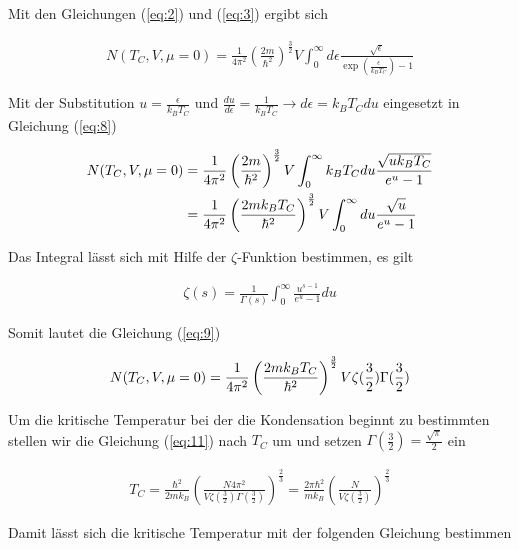 Mit den Gleichungen (\ref{eq:2}) und (\ref{eq:3}) ergibt sich

\begin{align}
  \label{eq:8}
   N(T_C,V,\mu=0) = \frac{1}{4\pi^2}\left( \frac{2m}{\hbar^2}  \right)^{\frac{3}{2}} V \int_0^\infty d\epsilon  \frac{\sqrt{\epsilon}}{\exp\left(\frac{\epsilon}{k_B T_C}\right)-1}
\end{align}

Mit der Substitution \(u=\frac{\epsilon}{k_B T_C}\) und \(\frac{du}{d\epsilon}=\frac{1}{k_B T_C} \rightarrow d\epsilon=k_B T_C du\) eingesetzt in Gleichung (\ref{eq:8})

\begin{align}
  \label{eq:9}
    N(T_C,V,\mu=0) &= \frac{1}{4\pi^2}\left( \frac{2m}{\hbar^2}  \right)^{\frac{3}{2}} V \int_0^\infty k_B T_C du  \frac{\sqrt{u k_B T_C}}{e^{u}-1} \notag\\
&=\frac{1}{4\pi^2}\left( \frac{2m k_B T_C}{\hbar^2}  \right)^{\frac{3}{2}} V  \int_0^\infty du  \frac{\sqrt{u}}{e^{u}-1} \notag\\
\end{align}

Das Integral lässt sich mit Hilfe der \(\zeta\)-Funktion bestimmen, es gilt

\begin{align}
  \label{eq:10}
  \zeta(s) = \frac{1}{\Gamma(s)} \int_0^\infty \frac{u^{s-1}}{e^u-1}du
\end{align}

Somit lautet die Gleichung (\ref{eq:9})

\begin{align}
  \label{eq:11}
   N(T_C,V,\mu=0) &= \frac{1}{4\pi^2}\left( \frac{2m k_B T_C}{\hbar^2}  \right)^{\frac{3}{2}} V \zeta(\frac{3}{2})\Gamma(\frac{3}{2})   \notag\\
\end{align}

Um die kritische Temperatur bei der die Kondensation beginnt zu bestimmten stellen wir die Gleichung (\ref{eq:11}) nach \(T_C\) um und setzen \(\Gamma(\frac{3}{2}) = \frac{\sqrt{\pi}}{2}\) ein

\begin{align}
  \label{eq:12}
  T_C = \frac{\hbar^2}{2m k_B}\left( \frac{N4\pi^2}{V\zeta(\frac{3}{2})\Gamma(\frac{3}{2})  } \right)^{\frac{2}{3}} = \frac{ 2\pi \hbar^2}{m k_B }\left( \frac{N}{V\zeta(\frac{3}{2})  } \right)^{\frac{2}{3}}
\end{align}

Damit lässt sich die kritische Temperatur mit der folgenden Gleichung bestimmen

